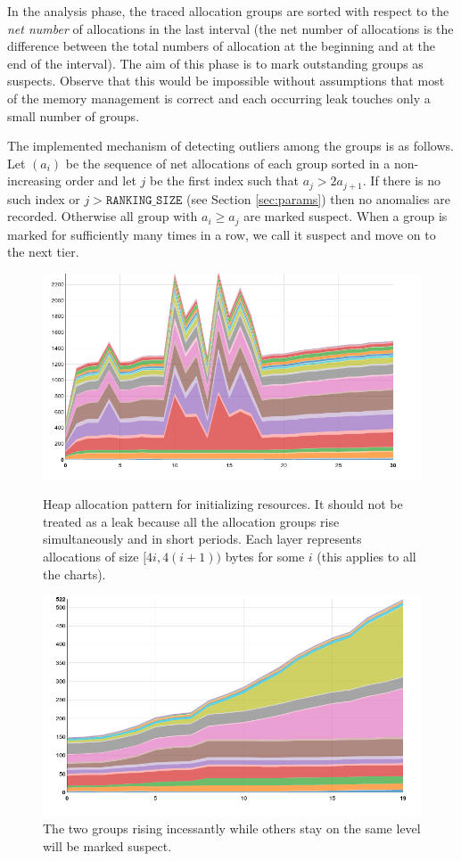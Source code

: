 \documentclass[preprint, numbers]{sigplanconf}
\begin{document}
In the analysis phase, the traced allocation groups are sorted with respect to the \textit{net number} of allocations
in the last interval
(the net number of allocations is the difference between the total numbers of allocation at
the beginning and at the end of the interval).
The aim of this phase is to mark outstanding groups as suspects.
Observe that this would be impossible without assumptions that
most of the memory management is correct and each occurring leak
touches only a small number of groups.

The implemented mechanism of detecting outliers among the groups is as follows.
Let $(a_i)$ be the sequence of net allocations of each group sorted in a non-increasing order
and let $j$ be the first index such that $a_j > 2a_{j+1}$.
If there is no such index or $j > \texttt{RANKING\_SIZE}$ (see Section \ref{sec:params}) then no anomalies are recorded.
Otherwise all group with $a_i \ge a_j$ are marked suspect.
When a group is marked for sufficiently many times in a row,
we call it suspect and move on to the next tier.

\begin{figure}
\centering
\includegraphics[scale=0.31]{chart1}
\caption{Heap allocation pattern for initializing resources.
	It should not be treated as a leak because all the allocation groups rise
	simultaneously and in short periods.
	Each layer represents allocations of size $[4i, 4(i+1))$ bytes for some $i$
	(this applies to all the charts).}
\label{fig:chart1}
\vspace{0.5cm}

\includegraphics[scale=0.31]{chart2}
\caption{The two groups rising incessantly while others stay on the same level will
	be marked suspect.}
\label{fig:chart2}
\end{figure}
\end{document}
